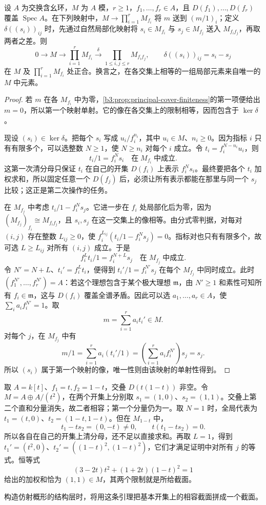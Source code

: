 \begin{lemma}\label{b3:lem:localization-sheaf-gluing}
	设 \(A\) 为交换含幺环，\(M\) 为 \(A\) 模，\(r\ge1\)，\(f_1,\ldots,f_r\in A\)，且 \(D(f_1),\ldots,D(f_r)\) 覆盖 \(\operatorname{Spec}A\)。在下列映射中，\(M\rightarrow\prod_{i=1}^rM_{f_i}\) 将 \(m\) 送到 \((m/1)_i\)；定义 \(\delta((s_i))_{ij}\) 时，先通过自然局部化映射将 \(s_i\in M_{f_i}\) 与 \(s_j\in M_{f_j}\) 送入 \(M_{f_if_j}\)，再取两者之差。则
	\[
		0\longrightarrow M\longrightarrow\prod_{i=1}^rM_{f_i} \xrightarrow{\delta}\prod_{1\le i,j\le r}M_{f_if_j}, \qquad \delta((s_i))_{ij}=s_i-s_j
	\]
	在 \(M\) 及 \(\prod_{i=1}^rM_{f_i}\) 处正合。换言之，在各交集上相等的一组局部元素来自唯一的 \(M\) 中元素。
\end{lemma}
\begin{proof}
	若 \(m\) 在各 \(M_{f_i}\) 中为零，\cref{b3:prop:principal-cover-finiteness}的第一项便给出 \(m=0\)，所以第一个映射单射。它的像在各交集上的限制相等，因而包含于 \(\ker\delta\)。

	现设 \((s_i)\in\ker\delta\)。把每个 \(s_i\) 写成 \(u_i/f_i^{n_i}\)，其中 \(u_i\in M\)、\(n_i\ge0\)。因为指标 \(i\) 只有有限多个，可以选整数 \(N\ge1\)，使 \(N\ge n_i\) 对每个 \(i\) 成立。令 \(t_i=f_i^{N-n_i}u_i\)，则
	\[
		t_i/1=f_i^Ns_i\quad\text{在}\;M_{f_i}\;\text{中成立}.
	\]
	这第一次清分母只保证 \(t_i\) 在自己的开集 \(D(f_i)\) 上表示 \(f_i^Ns_i\)。最终要把各个 \(t_i\) 加权求和，所以固定任意一个 \(D(f_j)\) 后，必须让所有表示都能在那里与同一个 \(s_j\) 比较；这正是第二次操作的任务。

	在 \(M_{f_j}\) 中考虑 \(t_i/1-f_i^Ns_j\)。它进一步在 \(f_i\) 处局部化后为零，因为 \((M_{f_j})_{f_i}\cong M_{f_if_j}\)，且 \(s_i,s_j\) 在这一交集上的像相等。由分式零判据，对每对 \((i,j)\) 存在整数 \(L_{ij}\ge0\)，使 \(f_i^{L_{ij}}(t_i/1-f_i^Ns_j)=0\)。指标对也只有有限多个，故可选 \(L\ge L_{ij}\) 对所有 \((i,j)\) 成立。于是
	\[
		f_i^Lt_i/1=f_i^{N+L}s_j\quad\text{在}\;M_{f_j}\;\text{中成立}.
	\]
	令 \(N'=N+L\)、\(t_i'=f_i^Lt_i\)，便得到 \(t_i'/1=f_i^{N'}s_j\) 在每个 \(M_{f_j}\) 中同时成立。此时 \((f_1^{N'},\ldots,f_r^{N'})=A\)：若这个理想包含于某个极大理想 \(\mathfrak m\)，由 \(N'\ge1\) 和素性可知所有 \(f_i\in\mathfrak m\)，这与 \(D(f_i)\) 覆盖全谱矛盾。因此可以选 \(a_1,\ldots,a_r\in A\)，使 \(\sum_i a_if_i^{N'}=1\)。取
	\[
		m=\sum_{i=1}^r a_it_i'\in M.
	\]
	对每个 \(j\)，在 \(M_{f_j}\) 中有
	\[
		m/1=\sum_{i=1}^r a_i(t_i'/1) =\left(\sum_{i=1}^r a_if_i^{N'}\right)s_j=s_j.
	\]
	所以 \((s_i)\) 属于第一个映射的像，唯一性则由该映射的单射性得到。
\end{proof}

取 \(A=k[t]\)、\(f_1=t,f_2=1-t\)，交叠 \(D(t(1-t))\) 非空。令 \(M=A\oplus A/(t^2)\)，在两个开集上分别取 \(s_1=(1,0)\)、\(s_2=(1,1)\)。交叠上第二个直和分量消失，故二者相容；第一个分量仍为一。取 \(N=1\) 时，全局代表为 \(t_1=(t,0)\)、\(t_2=(1-t,1-t)\)。但在 \(M_{1-t}\) 中，
\[
	t_1-ts_2=(0,-t)\ne0,\qquad t(t_1-ts_2)=0.
\]
所以各自在自己的开集上清分母，还不足以直接求和。再取 \(L=1\)，得到 \(t_1'=(t^2,0)\)、\(t_2'=((1-t)^2,(1-t)^2)\)，它们才满足证明中对所有 \(j\) 的等式。恒等式
\[
	(3-2t)t^2+(1+2t)(1-t)^2=1
\]
给出的加权和恰为 \((1,1)\in M\)，其两个限制就是所给截面。

\ProseParagraphBreak
{}构造仿射概形的结构层时，将用这条引理把基本开集上的相容截面拼成一个截面。
